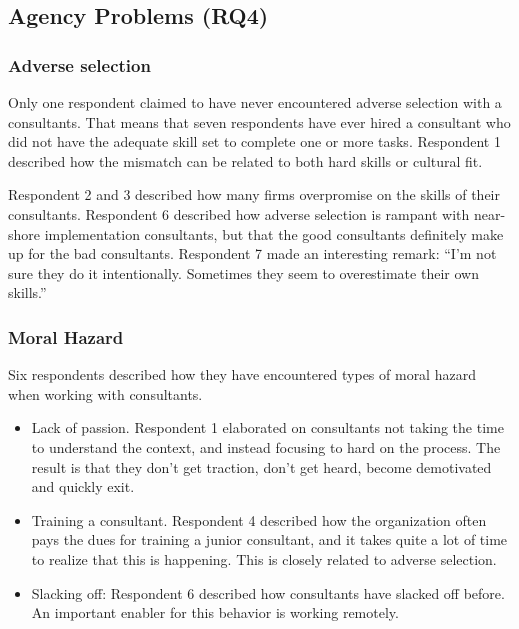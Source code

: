 \documentclass[12pt]{article}
\providecommand{\tightlist}{%
  \setlength{\itemsep}{0pt}\setlength{\parskip}{0pt}}
\begin{document}
\subsection{Agency Problems (RQ4)}\label{agency-problems-rq4}

\subsubsection{Adverse selection}\label{adverse-selection}

Only one respondent claimed to have never encountered adverse selection
with a consultants. That means that seven respondents have ever hired a
consultant who did not have the adequate skill set to complete one or
more tasks. Respondent 1 described how the mismatch can be related to
both hard skills or cultural fit.

Respondent 2 and 3 described how many firms overpromise on the skills of
their consultants. Respondent 6 described how adverse selection is
rampant with near-shore implementation consultants, but that the good
consultants definitely make up for the bad consultants. Respondent 7
made an interesting remark: ``I'm not sure they do it intentionally.
Sometimes they seem to overestimate their own skills.''

\subsubsection{Moral Hazard}\label{moral-hazard}

Six respondents described how they have encountered types of moral
hazard when working with consultants.

\begin{itemize}
\tightlist
\item
  Lack of passion. Respondent 1 elaborated on consultants not taking the
  time to understand the context, and instead focusing to hard on the
  process. The result is that they don't get traction, don't get heard,
  become demotivated and quickly exit.
\item
  Training a consultant. Respondent 4 described how the organization
  often pays the dues for training a junior consultant, and it takes
  quite a lot of time to realize that this is happening. This is closely
  related to adverse selection.
\item
  Slacking off: Respondent 6 described how consultants have slacked off
  before. An important enabler for this behavior is working remotely.
\end{itemize}
\end{document}
